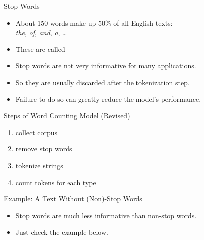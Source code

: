 \documentclass[professionalfonts, xcolor={usenames,svgnames,x11names,table}]{beamer}
\begin{document}
\begin{frame}{Stop Words}
    \begin{itemize}
        \item About 150 words make up 50\% of all English texts:\\
            \emph{the}, \emph{of}, \emph{and}, \emph{a}, \ldots
        \item These are called .
        \item Stop words are not very informative for many applications.
        \item So they are usually discarded after the tokenization step.
        \item Failure to do so can greatly reduce the model's performance. 
    \end{itemize}

    \pause
    \begin{block}{Steps of Word Counting Model (Revised)}
        \begin{enumerate}
            \item collect corpus
            \item remove stop words
            \item tokenize strings
            \item count tokens for each type
        \end{enumerate}
    \end{block}
\end{frame}

\begin{frame}{Example: A Text Without (Non)-Stop Words}
    \begin{itemize}
        \item Stop words are much less informative than non-stop words.
        \item Just check the example below.
    \end{itemize}


    \bigskip
\end{frame}
\end{document}
